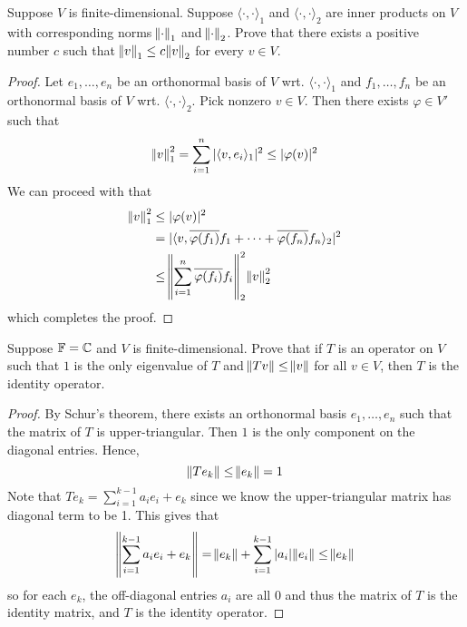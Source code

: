 \documentclass{extarticle}
\begin{document}
\begin{problem}{16}
    Suppose \(V\) is finite-dimensional. Suppose \(\langle \cdot,\cdot \rangle_1\) and 
    \(\langle \cdot,\cdot \rangle_2\) are inner products on \(V\) with corresponding norms 
    \(\norm{\cdot}_1\) and \(\norm{\cdot}_2\). Prove that there exists a positive number \(c\)
    such that \(\norm{v}_1 \leq c \norm{v}_2\) for every \(v \in V\).
\end{problem}

\begin{proof}
Let \(e_1, \ldots, e_n\) be an orthonormal basis of \(V\) wrt. \(\langle \cdot,\cdot \rangle_1\) 
and \(f_1, \ldots, f_n\) be an orthonormal basis of \(V\) wrt. \(\langle \cdot,\cdot \rangle_2\). Pick 
nonzero \( v \in V\). Then there exists \(\varphi \in V'\) such that 
\[ \norm{v}_1^2 = \sum_{i=1}^{n} |\langle v,e_i \rangle_1|^2 \leq |\varphi(v)|^2\]
We can proceed with that 
\begin{align*}
    \norm{v}_1^2 
    &\leq |\varphi(v)|^2  \\ 
    &= | \langle v, \overline{\varphi(f_1)}f_1 + \cdots + \overline{\varphi(f_n)}f_n \rangle_2  |^2 \\ 
    &\leq  \norm{\sum_{i=1}^{n} \overline{\varphi(f_i)}f_i}_2^2  \norm{v}_2^2 
\end{align*}
which completes the proof.
\end{proof}

\begin{problem}{17}
    Suppose \(\mathbb{F} = \mathbb{C}\) and \(V\) is finite-dimensional. Prove that if \(T\) is an operator on \(V\)
    such that \(1\) is the only eigenvalue of \(T\) and \(\norm{Tv} \leq \norm{v}\) for all \(v \in V\), 
    then \(T\) is the identity operator.
\end{problem}

\begin{proof}
    By Schur's theorem, there exists an orthonormal basis \(e_1, \ldots, e_n\) such that the matrix of \(T\) is 
    upper-triangular. Then \(1\) is the only component on the diagonal entries. Hence, 
    \[\norm{T e_k} \leq \norm{e_k} = 1\]
    Note that \(Te_k = \sum_{i=1}^{k-1}a_i e_i + e_k\) since we know the upper-triangular matrix has diagonal term to be 1. 
    This gives that 
    \[\norm{\sum_{i=1}^{k-1} a_i e_i + e_k} = \norm{e_k} + \sum_{i=1}^{k-1}|a_i| \norm{e_i} \leq \norm{e_k}\]
    so for each \(e_k\), the off-diagonal entries \(a_i\) are all 0 and thus the matrix of \(T\) is the identity 
    matrix, and \(T\) is the identity operator.
\end{proof}
\end{document}
